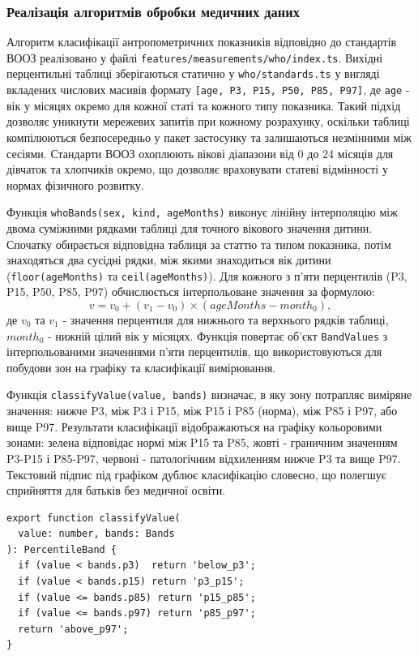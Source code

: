 \subsubsection{Реалізація алгоритмів обробки медичних даних}

Алгоритм класифікації антропометричних показників відповідно до стандартів \gls{ВООЗ} реалізовано у файлі \texttt{features/measurements/who/index.ts}. Вихідні перцентильні таблиці зберігаються статично у \texttt{who/standards.ts} у вигляді вкладених числових масивів формату \texttt{[age, P3, P15, P50, P85, P97]}, де \texttt{age} - вік у місяцях окремо для кожної статі та кожного типу показника. Такий підхід дозволяє уникнути мережевих запитів при кожному розрахунку, оскільки таблиці компілюються безпосередньо у пакет застосунку та залишаються незмінними між сесіями. Стандарти \gls{ВООЗ} охоплюють вікові діапазони від 0 до 24 місяців для дівчаток та хлопчиків окремо, що дозволяє враховувати статеві відмінності у нормах фізичного розвитку.

Функція \texttt{whoBands(sex, kind, ageMonths)} виконує лінійну інтерполяцію між двома суміжними рядками таблиці для точного вікового значення дитини. Спочатку обирається відповідна таблиця за статтю та типом показника, потім знаходяться два сусідні рядки, між якими знаходиться вік дитини (\texttt{floor(ageMonths)} та \texttt{ceil(ageMonths)}). Для кожного з п'яти перцентилів (P3, P15, P50, P85, P97) обчислюється інтерпольоване значення за формулою:
\[ v = v_0 + (v_1 - v_0) \times (ageMonths - month_0), \]
де $v_0$ та $v_1$ - значення перцентиля для нижнього та верхнього рядків таблиці, $month_0$ - нижній цілий вік у місяцях. Функція повертає об'єкт \texttt{BandValues} з інтерпольованими значеннями п'яти перцентилів, що використовуються для побудови зон на графіку та класифікації вимірювання.

Функція \texttt{classifyValue(value, bands)} визначає, в яку зону потрапляє виміряне значення: нижче P3, між P3 і P15, між P15 і P85 (норма), між P85 і P97, або вище P97. Результати класифікації відображаються на графіку кольоровими зонами: зелена відповідає нормі між P15 та P85, жовті - граничним значенням P3-P15 і P85-P97, червоні - патологічним відхиленням нижче P3 та вище P97. Текстовий підпис під графіком дублює класифікацію словесно, що полегшує сприйняття для батьків без медичної освіти.

\begin{verbatim}
export function classifyValue(
  value: number, bands: Bands
): PercentileBand {
  if (value < bands.p3)  return 'below_p3';
  if (value < bands.p15) return 'p3_p15';
  if (value <= bands.p85) return 'p15_p85';
  if (value <= bands.p97) return 'p85_p97';
  return 'above_p97';
}
\end{verbatim}

